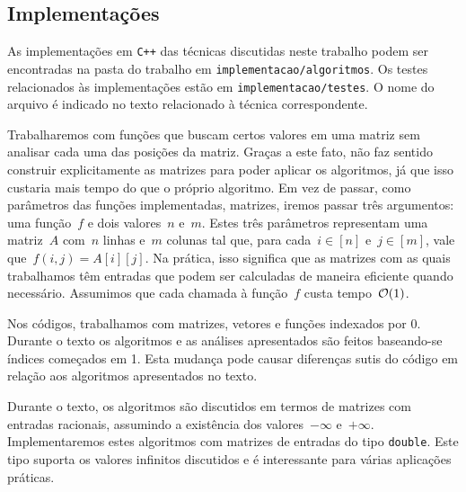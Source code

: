\subsection{Implementações} \label{Intro:impl}
As implementações em \texttt{C++} das técnicas discutidas neste trabalho podem ser encontradas na pasta do trabalho em \texttt{implementacao/algoritmos}. Os testes relacionados às implementações estão em \texttt{implementacao/testes}. O nome do arquivo é indicado no texto relacionado à técnica correspondente.

Trabalharemos com funções que buscam certos valores em uma matriz sem analisar cada uma das posições da matriz. Graças a este fato, não faz sentido construir explicitamente as matrizes para poder aplicar os algoritmos, já que isso custaria mais tempo do que o próprio algoritmo. Em vez de passar, como parâmetros das funções implementadas, matrizes, iremos passar três argumentos: uma função~$f$ e dois valores~$n$ e~$m$. Estes três parâmetros representam uma matriz~$A$ com~$n$ linhas e~$m$ colunas tal que, para cada~${ i \in [n] }$ e~${ j \in [m] }$, vale que~${ f(i,j) = A[i][j] }$. Na prática, isso significa que as matrizes com as quais trabalhamos têm entradas que podem ser calculadas de maneira eficiente quando necessário. Assumimos que cada chamada à função~$f$ custa tempo~$\mathcal{O}(1)$.

Nos códigos, trabalhamos com matrizes, vetores e funções indexados por 0. Durante o texto os algoritmos e as análises apresentados são feitos baseando-se índices começados em 1. Esta mudança pode causar diferenças sutis do código em relação aos algoritmos apresentados no texto.

Durante o texto, os algoritmos são discutidos em termos de matrizes com entradas racionais, assumindo a existência dos valores~$-\infty$ e~$+\infty$. Implementaremos estes algoritmos com matrizes de entradas do tipo \texttt{double}. Este tipo suporta os valores infinitos discutidos e é interessante para várias aplicações práticas.
